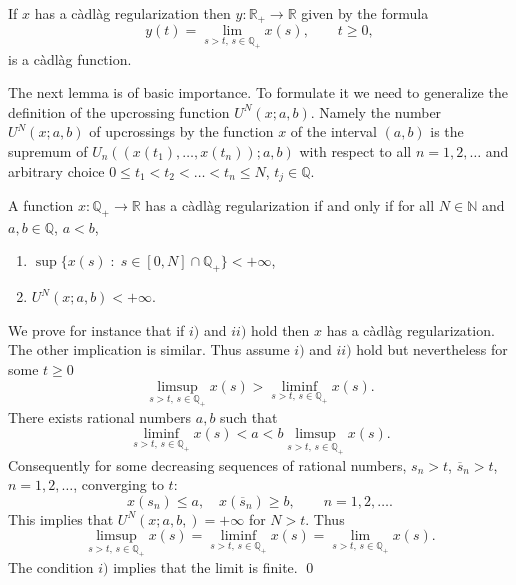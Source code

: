\documentclass[preprint]{imsart}
\def\N{\mathbb N}
\def\Q{\mathbb Q}
\def\R{\mathbb R}
\begin{document}
{\begin{Lemma}\label{regrazionali}
  If $x$ has a c\`adl\`ag regularization  then $y:\R_+\to \R$
  given by the formula
  $$
  y(t)= \lim_{s>t,\, s\in \Q_+}x(s),
\qquad t\ge 0,
$$
is a c\`adl\`ag function.
\end{Lemma}

The next lemma is of basic importance. To formulate it we need to
generalize the definition of the upcrossing function
$U^N(x;a,b)$. Namely the number $U^N(x;a,b)$ of upcrossings by the
function $x$ of the interval $(a,b)$ is the supremum of
$U_n((x(t_1),\ldots, x(t_n));a,b)$ with respect to all
$n=1,2,\ldots$ and arbitrary choice $0\leq t_1<t_2<\ldots <t_n\le
N$, $t_j\in \Q$.

\begin{Lemma}\label{regrazionalidue}
A function $x:\Q_+\to \R$ has a c\`adl\`ag regularization
if and only if for all $N\in\N$ and $a,b\in \Q$, $a<b$,
\begin{enumerate}
\item[i)]
$\sup \{ x(s)\; :\; s\in [0,N]\cap \Q_+\} <+\infty$,
\item[ii)]
$ U^N(x;a,b)<+\infty$.
\end{enumerate}
\end{Lemma}

We prove for instance that if $i)$ and $ii)$ hold then $x$ has a
 c\`adl\`ag regularization. The other implication is similar.
 Thus assume
$i)$ and $ii)$ hold but nevertheless for some $t\ge0$
$$
\limsup_{s>t,\, s\in \Q_+} x(s) >
\liminf_{s>t,\, s\in \Q_+} x(s).
$$
There exists rational numbers $a,b$ such that
$$
\liminf_{s>t,\, s\in \Q_+} x(s)<a<b
\limsup_{s>t,\, s\in \Q_+} x(s) .
$$
Consequently for some decreasing sequences of rational numbers,
$s_n>t$, $\overline{s}_n>t$, $n=1,2,\ldots$, converging to $t$:
$$
x(s_n)\le a,\quad x(\overline{s}_n)\ge b,
\qquad n=1,2,\ldots.
$$
This implies that $U^N(x;a,b,)=+\infty$ for $N>t$. Thus
$$
\limsup_{s>t,\, s\in \Q_+} x(s) =
\liminf_{s>t,\, s\in \Q_+} x(s)=
\lim_{s>t,\, s\in \Q_+} x(s).
$$
The condition $i)$ implies that the limit is finite.
\qed


}
\end{document}
